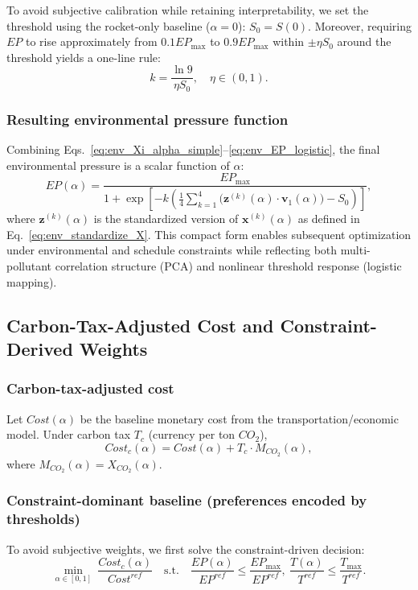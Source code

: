 \documentclass{mcmthesis}
\begin{document}
To avoid subjective calibration while retaining interpretability, we set the threshold using the rocket-only baseline ($\alpha=0$): $S_0=S(0)$.
Moreover, requiring $EP$ to rise approximately from $0.1EP_{\max}$ to $0.9EP_{\max}$ within $\pm \eta S_0$ around the threshold yields a one-line rule:
\begin{equation}
k=\frac{\ln 9}{\eta S_0},\quad \eta\in(0,1).
\label{eq:env_k_schemeA}
\end{equation}

\subsubsection{Resulting environmental pressure function}
Combining Eqs.~\eqref{eq:env_Xi_alpha_simple}--\eqref{eq:env_EP_logistic}, the final environmental pressure is a scalar function of $\alpha$:
\begin{equation}
EP(\alpha)=\frac{EP_{\max}}{1+\exp\!\left[-k\left(\frac{1}{4}\sum_{k=1}^{4}\big(\mathbf{z}^{(k)}(\alpha)\cdot \mathbf{v}_1(\alpha)\big)-S_0\right)\right]},
\label{eq:env_EP_alpha_final}
\end{equation}
where $\mathbf{z}^{(k)}(\alpha)$ is the standardized version of $\mathbf{x}^{(k)}(\alpha)$ as defined in Eq.~\eqref{eq:env_standardize_X}. This compact form enables subsequent optimization under environmental and schedule constraints while reflecting both multi-pollutant correlation structure (PCA) and nonlinear threshold response (logistic mapping).


\subsection{Carbon-Tax-Adjusted Cost and Constraint-Derived Weights}
\label{subsec:env_en_opt}
\subsubsection*{Carbon-tax-adjusted cost}
Let $Cost(\alpha)$ be the baseline monetary cost from the transportation/economic model. Under carbon tax $T_c$ (currency per ton $CO_2$),
\begin{equation}
Cost_c(\alpha)=Cost(\alpha)+T_c\cdot M_{CO_2}(\alpha),
\label{eq:env_carbon_cost_en}
\end{equation}
where $M_{CO_2}(\alpha)=X_{CO_2}(\alpha)$.

\subsubsection*{Constraint-dominant baseline (preferences encoded by thresholds)}
To avoid subjective weights, we first solve the constraint-driven decision:
\begin{equation}
\min_{\alpha\in[0,1]}\ \frac{Cost_c(\alpha)}{Cost^{ref}}
\quad \text{s.t.}\quad
\frac{EP(\alpha)}{EP^{ref}}\le \frac{EP_{\max}}{EP^{ref}},\ 
\frac{T(\alpha)}{T^{ref}}\le \frac{T_{\max}}{T^{ref}}.
\label{eq:env_constrained_problem_en}
\end{equation}
\end{document}
